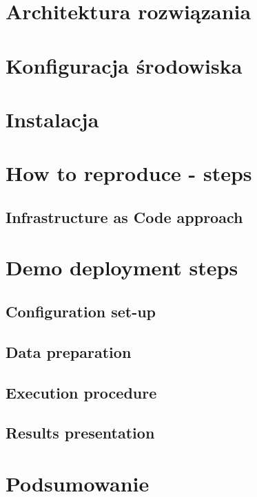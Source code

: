 \documentclass[onecolumn,12pt]{article}
\begin{document}
\section{Architektura rozwiązania}

\section{Konfiguracja środowiska}

\section{Instalacja}

\section{How to reproduce - steps}

\subsection{Infrastructure as Code approach}

\section{Demo deployment steps}

\subsection{Configuration set-up}
\subsection{Data preparation}
\subsection{Execution procedure}
\subsection{Results presentation}

\section{Podsumowanie}

%
\end{document}
